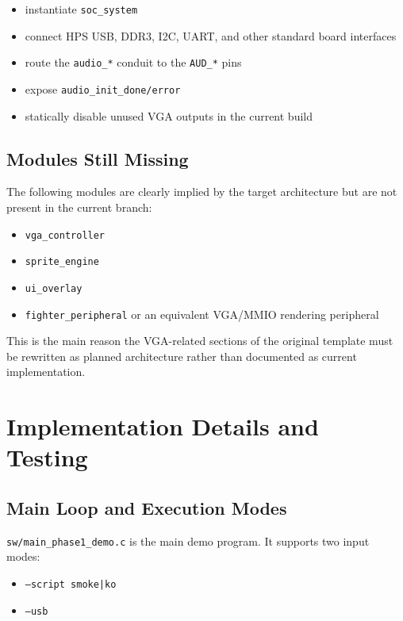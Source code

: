 \documentclass[12pt,a4paper]{article}
\begin{document}
\begin{itemize}
  \item instantiate \texttt{soc\_system}
  \item connect HPS USB, DDR3, I2C, UART, and other standard board interfaces
  \item route the \texttt{audio\_*} conduit to the \texttt{AUD\_*} pins
  \item expose \texttt{audio\_init\_done/error}
  \item statically disable unused VGA outputs in the current build
\end{itemize}

\subsection{Modules Still Missing}

The following modules are clearly implied by the target architecture but are not present in the current branch:

\begin{itemize}
  \item \texttt{vga\_controller}
  \item \texttt{sprite\_engine}
  \item \texttt{ui\_overlay}
  \item \texttt{fighter\_peripheral} or an equivalent VGA/MMIO rendering peripheral
\end{itemize}

This is the main reason the VGA-related sections of the original template must be rewritten as planned architecture rather than documented as current implementation.

\section{Implementation Details and Testing}

\subsection{Main Loop and Execution Modes}

\texttt{sw/main\_phase1\_demo.c} is the main demo program. It supports two input modes:

\begin{itemize}
  \item \texttt{--script smoke|ko}
  \item \texttt{--usb}
\end{itemize}
\end{document}
